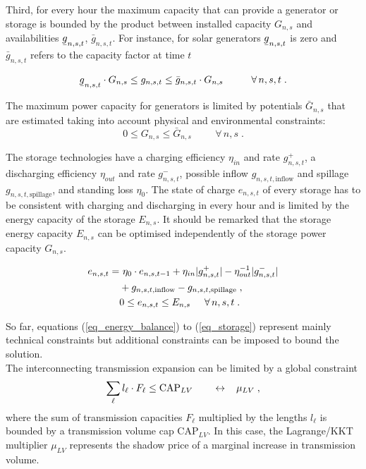 \documentclass[3p]{elsarticle} %
\newcommand{\ubar}[1]{\text{\b{$#1$}}}
\begin{document}
Third, for every hour the maximum capacity that can provide a generator or storage is bounded by the product between installed capacity $G_{n,s}$ and availabilities $\ubar{g}_{n,s,t}$, $\bar{g}_{n,s,t}$. For instance, for solar generators $\ubar{g}_{n,s,t}$ is zero and $\bar{g}_{n,s,t}$ refers to the capacity factor at time $t$ 

\begin{equation}
\ubar{g}_{n,s,t} \cdot G_{n,s} \leq g_{n,s,t} \leq \bar{g}_{n,s,t} \cdot G_{n,s} \hspace{1cm} \forall\, n,s,t \; . \label{eq_g}
\end{equation}

The maximum power capacity for generators is limited by potentials $\bar{G}_{n,s}$ that are estimated taking into account physical and environmental constraints:
\begin{equation}\label{eq_max_G}
0 \leq G_{n,s}\leq \bar{G}_{n,s} \hspace{1cm} \forall\, n,s \; .
\end{equation}

The storage technologies have a charging efficiency $\eta_{in}$ and rate $g_{n,s,t}^+$, a discharging efficiency $\eta_{out}$ and rate $g_{n,s,t}^-$, possible inflow $g_{n,s,t,\textrm{inflow}}$ and spillage $g_{n,s,t,\textrm{spillage}}$, and standing loss $\eta_0$. The state of charge $e_{n,s,t}$ of every storage has to be consistent with charging and discharging in every hour and is limited by the energy capacity of the storage $E_{n,s}$. It should be remarked that the storage energy capacity $E_{n,s}$ can be optimised independently of the storage power capacity $G_{n,s}$.

\begin{align}
e_{n,s,t} = & \ \eta_0 \cdot e_{n,s,t-1} + \eta_{in} |g_{n,s,t}^+| - \eta_{out}^{-1} |g_{n,s,t}^-| \nonumber \\
& + g_{n,s,t,\textrm{inflow}} - g_{n,s,t,\textrm{spillage}} \; , \nonumber \\
& 0  \leq   e_{n,s,t} \leq E_{n,s}   \hspace{0.5cm} \forall\, n,s,t \; . \label{eq_storage}
\end{align}

So far, equations (\ref{eq_energy_balance}) to (\ref{eq_storage}) represent mainly technical constraints but additional constraints can be imposed to bound the solution.\\

The interconnecting transmission expansion can be limited by a global constraint
\begin{equation}
\sum_{\ell} l_\ell \cdot F_{\ell} \leq  \textrm{CAP}_{LV} \hspace{.7cm} \leftrightarrow \hspace{0.3cm} \mu_{LV} \; ,
\label{eq_cap}
\end{equation}
where the sum of transmission capacities $F_{\ell}$ multiplied by the lengths $l_{\ell}$ is bounded by a transmission volume cap $\textrm{CAP}_{LV}$. In this case, the Lagrange/KKT multiplier $\mu_{LV}$ represents the shadow price of a marginal increase in transmission volume.\\
\end{document}
